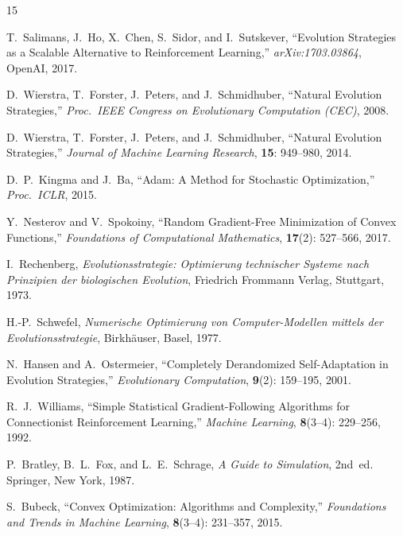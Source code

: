 \documentclass[12pt, a4paper]{article}
\begin{document}
\begin{thebibliography}{15}

T.~Salimans, J.~Ho, X.~Chen, S.~Sidor, and I.~Sutskever,
\newblock ``Evolution Strategies as a Scalable Alternative to Reinforcement
  Learning,''
\newblock \textit{arXiv:1703.03864}, OpenAI, 2017.

D.~Wierstra, T.~Forster, J.~Peters, and J.~Schmidhuber,
\newblock ``Natural Evolution Strategies,''
\newblock \textit{Proc.\ IEEE Congress on Evolutionary Computation (CEC)},
  2008.

D.~Wierstra, T.~Forster, J.~Peters, and J.~Schmidhuber,
\newblock ``Natural Evolution Strategies,''
\newblock \textit{Journal of Machine Learning Research},
  \textbf{15}: 949--980, 2014.

D.~P.~Kingma and J.~Ba,
\newblock ``Adam: A Method for Stochastic Optimization,''
\newblock \textit{Proc.\ ICLR}, 2015.

Y.~Nesterov and V.~Spokoiny,
\newblock ``Random Gradient-Free Minimization of Convex Functions,''
\newblock \textit{Foundations of Computational Mathematics},
  \textbf{17}(2): 527--566, 2017.

I.~Rechenberg,
\newblock \textit{Evolutionsstrategie: Optimierung technischer Systeme nach
  Prinzipien der biologischen Evolution},
\newblock Friedrich Frommann Verlag, Stuttgart, 1973.

H.-P.~Schwefel,
\newblock \textit{Numerische Optimierung von Computer-Modellen mittels der
  Evolutionsstrategie},
\newblock Birkh\"{a}user, Basel, 1977.

N.~Hansen and A.~Ostermeier,
\newblock ``Completely Derandomized Self-Adaptation in Evolution Strategies,''
\newblock \textit{Evolutionary Computation}, \textbf{9}(2): 159--195, 2001.

R.~J.~Williams,
\newblock ``Simple Statistical Gradient-Following Algorithms for
  Connectionist Reinforcement Learning,''
\newblock \textit{Machine Learning}, \textbf{8}(3--4): 229--256, 1992.

P.~Bratley, B.~L.~Fox, and L.~E.~Schrage,
\newblock \textit{A Guide to Simulation}, 2nd~ed.
\newblock Springer, New York, 1987.

S.~Bubeck,
\newblock ``Convex Optimization: Algorithms and Complexity,''
\newblock \textit{Foundations and Trends in Machine Learning},
  \textbf{8}(3--4): 231--357, 2015.


\end{thebibliography}
\end{document}
